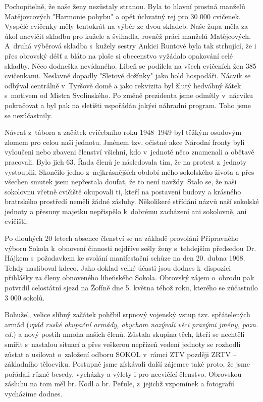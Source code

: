 \documentclass[a5paper, 12pt, twoside]{article}
\begin{document}
Pochopitelně, že naše ženy nezůstaly stranou. Byla to hlavní prostná
manželů Matějovcových "Harmonie pohybu" a opět úchvatný rej pro 30 000
cvičenek. Vyspělé cvičenky měly tentokrát na výběr ze dvou skladeb. Naše
župa měla za úkol nacvičit skladbu pro kužele a švihadla, rovněž práci
manželů Matějcových. A~druhá výběrová skladba s~kužely sestry Ankici
Runtové byla tak strhující, že i přes obrovský déšť a bláto na ploše si
obecenstvo vyžádalo opakování celé skladby. Něco dodneška nevídaného.
Libeň se podílela na všech cvičeních žen 385 cvičenkami. Neslavně
dopadly "Sletové dožínky" jako hold hospodáři. Nácvik se odbýval
centrálně v~Tyršově domě a jako rekvizita byl žlutý hedvábný šátek
s~motivem od Mistra Svolinského. Po změně prezidenta jsme odmítly
v~nácviku pokračovat a byl pak na sletišti uspořádán jakýsi náhradní
program. Toho jsme se nezúčastnily.

Návrat z~tábora a začátek cvičebního roku 1948--1949 byl
těžkým osudovým zlomem pro celou naši jednotu. Jménem tzv. očistné akce
Národní fronty byli vyloučeni nebo zbaveni členství všichni, kdo
v~jednotě něco znamenali a obětavě pracovali. Bylo jich 63. Řada členů je
následovala tím, že na protest z~jednoty vystoupili. Skončilo jedno
z~nejkrásnějších období mého sokolského života a přes všechen smutek jsem
nepřestala doufat, že to není navždy. Stalo se, že naši sokolovnu včetně
cvičiště okupovali ti, kteří na postavení budovy a krásného bratrského
prostředí neměli žádné zásluhy. Několikeré střídání názvů naší sokolské
jednoty a přesuny majetku nepřispělo k~dobrému zacházení ani sokolovně,
ani cvičišti.

Po dlouhých 20 letech absence členství se na základě provolání
Přípravného výboru Sokola k~obnovení činnosti nejdříve sešly ženy
s~tehdejším předsedou Dr. Hájkem s~požadavkem ke svolání manifestační
schůze na den 20. dubna 1968. Tehdy nasliboval kdeco. Jako doklad velké
účasti jsou dodnes k~dispozici přihlášky za členy obnoveného libeňského
Sokola. Obrovský zájem o~obrodu pak potvrdil celostátní sjezd na Žofíně
dne 5. května téhož roku, kterého se zúčastnilo 3 000 sokolů.

Bohužel, velice slibný začátek pohřbil srpnový vojenský vstup tzv.
spřátelených armád (\textit{vpád ruské okupační armády, abychom nazývali
věci pravými jmény, pozn. ed.}) a nový postih mnoha našich členů.
Zůstala skupina těch, kteří se nechtěli smířit s~nastalou situací a přes
veškerou nepřízeň vedení jednoty se rozhodli zůstat a usilovat
o~založení odboru SOKOL v~rámci ZTV později ZRTV -- základního tělocviku.
Postupně jsme získávali další zájemce také proto, že jsme pořádali různé
besedy, vycházky a výlety i pro necvičící členstvo. Obrovskou zásluhu na
tom měl br. Kodl a br. Peťule, z~jejichž vzpomínek a fotografií
vycházíme dodnes.
\end{document}
